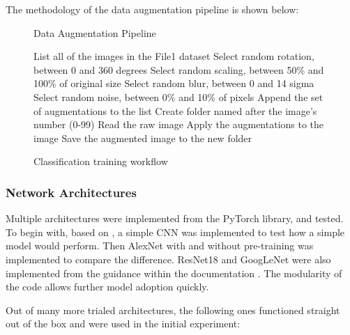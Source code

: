\documentclass[conference]{IEEEtran}
\begin{document}
The methodology of the data augmentation pipeline is shown below:

\begin{figure}[H]
  \begin{algorithm}[H]
  \caption{Data Augmentation Pipeline}
  \begin{algorithmic}[1]
  \STATE List all of the images in the File1 dataset
      \STATE Select random rotation, between 0 and 360 degrees
      \STATE Select random scaling, between 50\% and 100\% of original size
      \STATE Select random blur, between 0 and 14 sigma
      \STATE Select random noise, between 0\% and 10\% of pixels
      \STATE Append the set of augmentations to the list
    \ENDWHILE
      \STATE Create folder named after the image's number (0-99)
      \STATE Read the raw image
        \STATE Apply the augmentations to the image
        \STATE Save the augmented image to the new folder
      \ENDFOR
    \ENDFOR
  \end{algorithmic}
  \end{algorithm}
  \caption{Classification training workflow}
  \end{figure}

\subsubsection{Network Architectures}

Multiple architectures were implemented from the PyTorch library, and tested. To begin with, based on \textcite{pytorch_cifar10}, a simple CNN was implemented to test
how a simple model would perform. Then AlexNet with and without pre-training was implemented to compare the difference. ResNet18 and GoogLeNet were also implemented
from the guidance within the documentation \textcite{pytorch_models}. The modularity of the code allows further model adoption quickly.

Out of many more trialed architectures, the following ones functioned straight out of the box and were used in the initial experiment:
\end{document}

